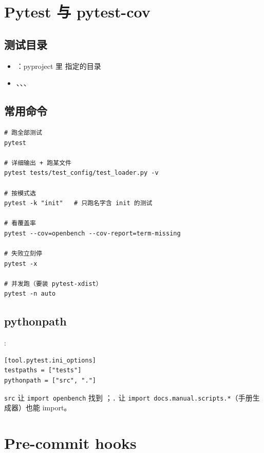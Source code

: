 \section{Pytest 与 pytest-cov}

\subsection{测试目录}

\begin{itemize}
  \item {}：pyproject 里  指定的目录
  \item {}、、、
\end{itemize}

\subsection{常用命令}

\begin{verbatim}
# 跑全部测试
pytest

# 详细输出 + 跑某文件
pytest tests/test_config/test_loader.py -v

# 按模式选
pytest -k "init"   # 只跑名字含 init 的测试

# 看覆盖率
pytest --cov=openbench --cov-report=term-missing

# 失败立刻停
pytest -x

# 并发跑（要装 pytest-xdist）
pytest -n auto
\end{verbatim}

\subsection{pythonpath}

:

\begin{verbatim}
[tool.pytest.ini_options]
testpaths = ["tests"]
pythonpath = ["src", "."]
\end{verbatim}

\texttt{src} 让 \texttt{import openbench} 找到 ；\texttt{.} 让 \texttt{import docs.manual.scripts.*}（手册生成器）也能 import。

\section{Pre-commit hooks}

